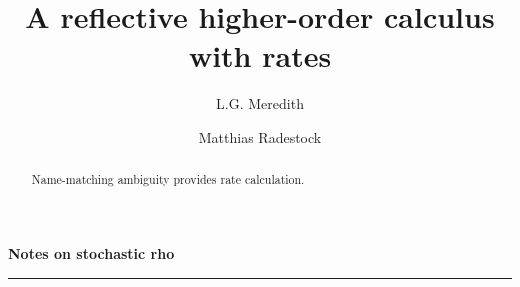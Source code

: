 \documentclass[]{amsart}
\theoremstyle{definition}
\theoremstyle{remark}
\numberwithin{equation}{subsection}
\newcommand{\papertitle}{A reflective higher-order calculus with rates}
\newcommand{\paperversion}{Draft Version 0.1 - December 20, 2004}
\newenvironment{toc}
{
\begin{list}{}{
   \setlength{\leftmargin}{0.4in}
   \setlength{\rightmargin}{0.6in}
   \setlength{\parskip}{0pt}
 } \item }
{\end{list}}
\begin{document}
\setlength{\topmargin}{0in}
\setlength{\textheight}{8.5in}
\setlength{\parskip}{6pt}

\title{\papertitle}

\author{ L.G. Meredith }
\author{ Matthias Radestock }







\dedicatory{}



\begin{abstract}
\normalsize{ 

Name-matching ambiguity provides rate calculation.

}

\end{abstract}

\noindent
{\large \textbf{Notes on stochastic rho}}\\
\rule{6.25in}{0.75pt}\\\\\\

\maketitle


\end{document}
